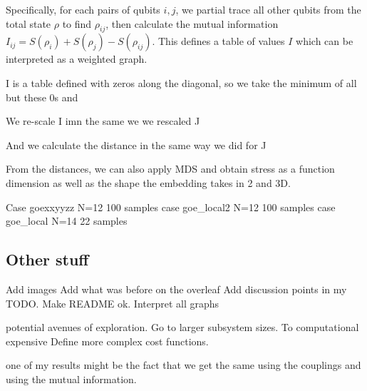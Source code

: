 \documentclass{article}
\begin{document}
Specifically, for each pairs of qubits $i,j$, we partial trace all other qubits from the total state $\rho$ to find $\rho_{ij}$, then calculate the mutual information $I_{ij}=S(\rho_i)+S(\rho_j)-S(\rho_{ij})$.
This defines a table of values $I$ which can be interpreted as a weighted graph.

I is a table defined with zeros along the diagonal, so we take the minimum of all but these 0s and 

We re-scale I imn the same we we rescaled J

And we calculate the distance in the same way we did for J

From the distances, we can also apply MDS and obtain stress as a function dimension as well as the shape the embedding takes in 2 and 3D.

\begin{figure}
    
\end{figure}

Case goexxyyzz N=12 100 samples
case goe_local2 N=12 100 samples
case goe_local N=14 22 samples




\subsection*{Other stuff}

Add images
Add what was before on the overleaf
Add discussion points in my TODO.
Make README ok.
Interpret all graphs

potential avenues of exploration. 
Go to larger subsystem sizes. To computational expensive
Define more complex cost functions.

one of my results might be the fact that we get the same using the couplings and using the mutual information.
\end{document}
